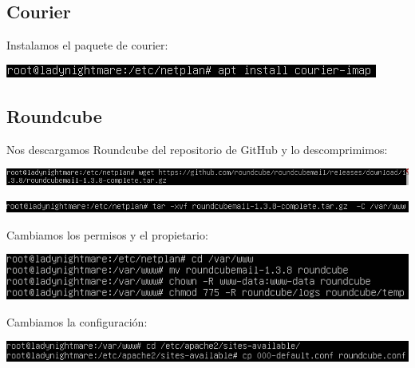 \documentclass{article}
\begin{document}
\subsection{Courier}

Instalamos el paquete de courier:

\begin{center}
\includegraphics[scale=0.6]{images/courier.png}
\end{center}

\subsection{Roundcube}

Nos descargamos Roundcube del repositorio de GitHub y lo descomprimimos:

\begin{center}
\includegraphics[scale=0.6]{images/roundcube.png}
\end{center}

\begin{center}
\includegraphics[scale=0.6]{images/tar.png}
\end{center}

Cambiamos los permisos y el propietario:

\begin{center}
\includegraphics[scale=0.6]{images/perm.png}
\end{center}

Cambiamos la configuración:

\begin{center}
\includegraphics[scale=0.6]{images/conf.png}
\end{center}
\end{document}
